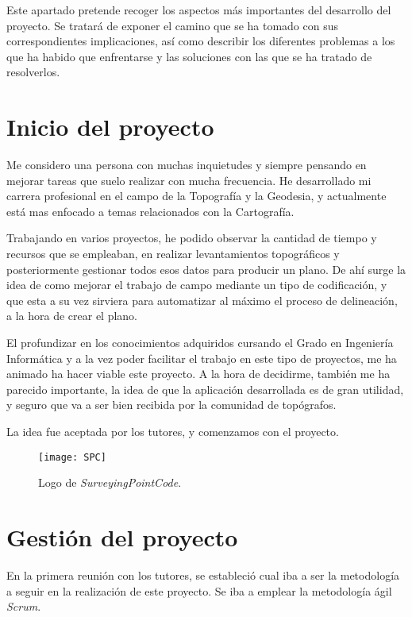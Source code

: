 
Este apartado pretende recoger los aspectos más importantes del desarrollo del proyecto. Se tratará de exponer el camino que se ha tomado con sus correspondientes implicaciones, así como describir los diferentes problemas a
los que ha habido que enfrentarse y las soluciones con las que se ha tratado de resolverlos.

\section{Inicio del proyecto}

Me considero una persona con muchas inquietudes y siempre pensando en mejorar tareas que suelo realizar con mucha frecuencia. He desarrollado mi carrera profesional en el campo de la Topografía y la Geodesia, y actualmente está mas enfocado a temas relacionados con la Cartografía.

Trabajando en varios proyectos, he podido observar la cantidad de tiempo y recursos que se empleaban, en realizar levantamientos topográficos y posteriormente gestionar todos esos datos para producir un plano. De ahí surge la idea de como mejorar el trabajo de campo mediante un tipo de codificación,  y que esta a su vez sirviera para automatizar al máximo el proceso de delineación, a la hora de  crear el plano.

El profundizar en los conocimientos adquiridos cursando el Grado en Ingeniería Informática y a la vez poder facilitar el trabajo en este tipo de proyectos, me ha animado ha hacer viable este proyecto. A la hora de decidirme, también me ha parecido importante, la idea de que la aplicación desarrollada es de gran utilidad, y seguro que va a ser bien recibida por la comunidad de topógrafos.

La idea fue aceptada por los tutores, y comenzamos con el proyecto.

\begin{figure}[!h]
	\centering
	\texttt{[image: SPC]}
	\caption{Logo de \emph{SurveyingPointCode}.}
	\label{fig:SPC}
\end{figure}


\section{Gestión del proyecto}

En la primera reunión con los tutores, se estableció cual iba a ser la metodología a seguir en la realización de este proyecto. Se iba a emplear la metodología ágil \emph{Scrum}.

